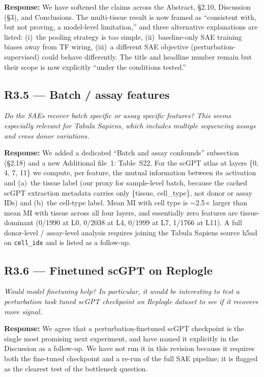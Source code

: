 \documentclass[11pt]{article}
\newcommand{\reviewercomment}[1]{\textit{\color{gray}#1}}
\newcommand{\response}[1]{\textbf{Response:} #1}
\begin{document}
\response{We have softened the claims across the Abstract, \S2.10, Discussion (\S3), and Conclusions. The multi-tissue result is now framed as ``consistent with, but not proving, a model-level limitation,'' and three alternative explanations are listed: (i)~the pooling strategy is too simple, (ii)~baseline-only SAE training biases away from TF wiring, (iii)~a different SAE objective (perturbation-supervised) could behave differently. The title and headline number remain but their scope is now explicitly ``under the conditions tested.''}

\subsection*{R3.5 --- Batch / assay features}
\reviewercomment{Do the SAEs recover batch specific or assay specific features? This seems especially relevant for Tabula Sapiens, which includes multiple sequencing assays and cross donor variations.}

\response{We added a dedicated ``Batch and assay confounds'' subsection (\S2.18) and a new Additional file~1: Table~S22. For the scGPT atlas at layers \{0, 4, 7, 11\} we compute, per feature, the mutual information between its activation and (a)~the tissue label (our proxy for sample-level batch, because the cached scGPT extraction metadata carries only \{tissue, cell\_type\}, not donor or assay IDs) and (b)~the cell-type label. Mean MI with cell type is $\sim$2.5$\times$ larger than mean MI with tissue across all four layers, and essentially zero features are tissue-dominant (0/1990 at L0, 0/2038 at L4, 0/1999 at L7, 1/1766 at L11). A full donor-level / assay-level analysis requires joining the Tabula Sapiens source h5ad on \texttt{cell\_idx} and is listed as a follow-up.}

\subsection*{R3.6 --- Finetuned scGPT on Replogle}
\reviewercomment{Would model finetuning help? In particular, it would be interesting to test a perturbation task tuned scGPT checkpoint on Replogle dataset to see if it recovers more signal.}

\response{We agree that a perturbation-finetuned scGPT checkpoint is the single most promising next experiment, and have named it explicitly in the Discussion as a follow-up. We have not run it in this revision because it requires both the fine-tuned checkpoint and a re-run of the full SAE pipeline; it is flagged as the clearest test of the bottleneck question.}
\end{document}
